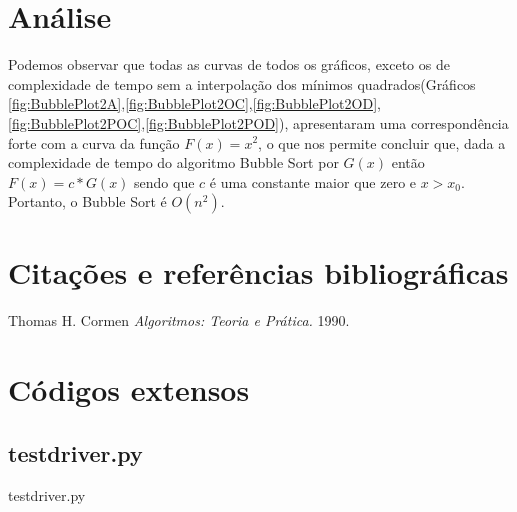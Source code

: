 \documentclass[12pt,a4paper,twoside]{report}
\begin{document}
\chapter{Análise}

Podemos observar que todas as curvas de todos os gráficos, exceto os de complexidade de tempo sem a interpolação dos mínimos quadrados(Gráficos \ref{fig:BubblePlot2A},\ref{fig:BubblePlot2OC},\ref{fig:BubblePlot2OD},\ref{fig:BubblePlot2POC},\ref{fig:BubblePlot2POD}), apresentaram uma correspondência forte com a curva da função $F(x) = x^2$, o que nos permite concluir que, dada a complexidade de tempo do algoritmo Bubble Sort por $G(x)$ então $F(x) = c * G(x)$ sendo que $c$ é uma constante maior que zero e $x > x_0$. Portanto, o Bubble Sort é $O(n^2)$.

\chapter{Citações e referências bibliográficas}
	\begin{thebibliography}{1}
	
		 Thomas H. Cormen {\em 
		Algoritmos: Teoria e Prática.
		}  1990.
	
	\end{thebibliography}







\clearpage
{}
\appendix

\chapter{Códigos extensos \label{ap:testdriver}}
\section{testdriver.py}
 {testdriver.py}
\end{document}
